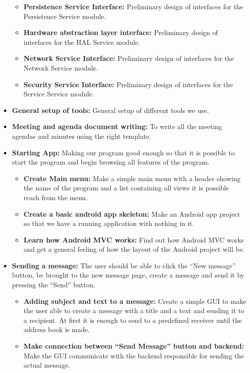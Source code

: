 \begin{itemize}
\begin{itemize}
\item{}\textbf{Persistence Service Interface:} Preliminary design of interfaces for the Persistence Service module.
\item{}\textbf{Hardware abstraction layer interface:} Preliminary design of interfaces for the HAL Service module.
\item{}\textbf{Network Service Interface:} Preliminary design of interfaces for the Network Service module.
\item{}\textbf{Security Service Interface:} Preliminary design of interfaces for the Service Service module.
\end{itemize}
\item{}\textbf{General setup of tools:} General setup of different tools we use.
\item{}\textbf{Meeting and agenda document writing:} To write all the meeting agendas and minutes using the right template.
\item{}\textbf{Starting App:} Making our program good enough so that it is possible to start the program and begin browsing all features of the program.
\begin{itemize}
\item{}\textbf{Create Main menu:} Make a simple main menu with a header showing the name of the program and a list containing all views it is possible reach from the menu.
\item{}\textbf{Create a basic android app skeleton:} Make an Android app project so that we have a running application with nothing in it.
\item{}\textbf{Learn how Android MVC works:} Find out how Android MVC works and get a general feeling of how the layout of the Android project will be.
\end{itemize}
\item{}\textbf{Sending a message:} The user should be able to click the “New message” button, be brought to the new message page, create a message and send it by pressing the “Send” button.
\begin{itemize}
\item{}\textbf{Adding subject and text to a message:} Create a simple GUI to make the user able to create a message with a title and a text and sending it to a recipient. At first it is enough to send to a predefined receiver until the address book is made.
\item{}\textbf{Make connection between “Send Message” button and backend:} Make the GUI communicate with the backend responsible for sending the actual message.

\end{itemize}
\end{itemize}
